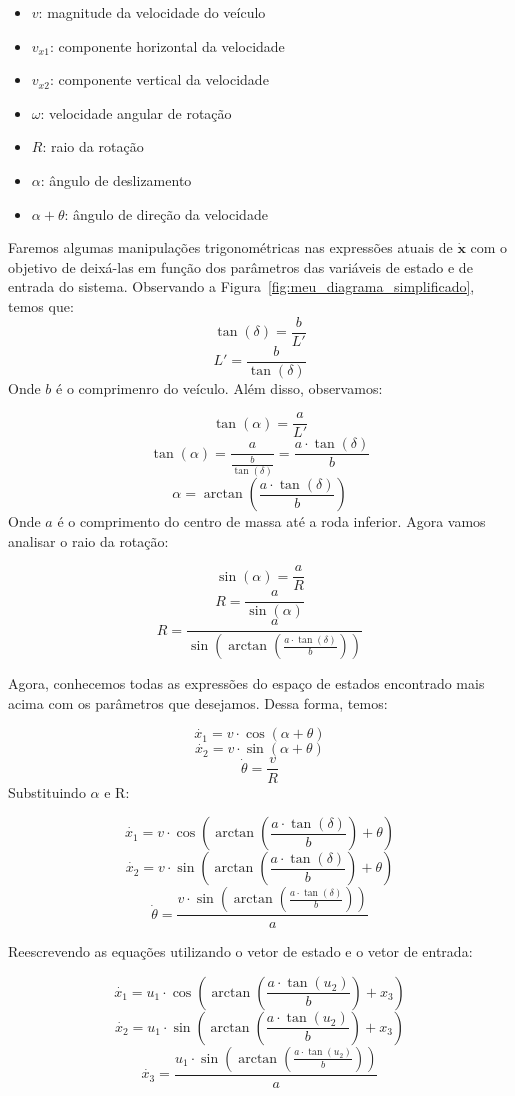 \documentclass[a4paper,11pt]{article}
\begin{document}
\begin{itemize}
    \item $v$: magnitude da velocidade do veículo 
    \item $v_{x1}$: componente horizontal da velocidade
    \item $v_{x2}$: componente vertical da velocidade
    \item $\omega$: velocidade angular de rotação
    \item $R$: raio da rotação
    \item $\alpha$: ângulo de deslizamento
    \item $\alpha + \theta$: ângulo de direção da velocidade 
\end{itemize}

Faremos algumas manipulações trigonométricas nas expressões atuais de $\dot{\textbf{x}}$ com o objetivo de deixá-las em função dos parâmetros das variáveis de estado e de entrada do sistema. Observando a Figura~\ref{fig:meu_diagrama_simplificado}, temos que:
\[
    \tan(\delta) = \frac{b}{L'}
\]
\[
    L' = \frac{b}{\tan(\delta)}
\]
Onde $b$ é o comprimenro do veículo. Além disso, observamos:

\[
    \tan(\alpha) = \frac{a}{L'}
\] 
\[
    \tan(\alpha) = \frac{a}{\frac{b}{\tan(\delta)}} =\frac{a \cdot \tan(\delta)}{b}
\]
\[
    \alpha = \arctan(\frac{a \cdot \tan(\delta)}{b})
\]
Onde $a$ é o comprimento do centro de massa até a roda inferior. Agora vamos analisar o raio da rotação:

\[
    \sin{(\alpha)} = \frac{a}{R}
\]
\[
    R = \frac{a}{\sin{(\alpha)}}
\]
\[
    R = \frac{a}{\sin{(\arctan(\frac{a \cdot \tan(\delta)}{b}))}}
\]

Agora, conhecemos todas as expressões do espaço de estados encontrado mais acima com os parâmetros que desejamos. Dessa forma, temos:

\[
    \dot{x_1} = v \cdot \cos{(\alpha + \theta)}
\]
\[
    \dot{x_2} = v \cdot \sin{(\alpha + \theta)}
\]
\[
    \dot{\theta} = \dfrac{v}{R}
\]
Substituindo $\alpha$ e R:

\[  
    \dot{x_1} = v \cdot \cos{(\arctan(\frac{a \cdot \tan(\delta)}{b}) + \theta)}
\]
\[
    \dot{x_2} = v \cdot \sin{(\arctan(\frac{a \cdot \tan(\delta)}{b}) + \theta)}
\]
\[
    \dot{\theta} = \frac{v \cdot \sin{(\arctan(\frac{a \cdot \tan(\delta)}{b}))}}{a}
\]

Reescrevendo as equações utilizando o vetor de estado e o vetor de entrada:

\[  
    \dot{x_1} = u_1 \cdot \cos{(\arctan(\frac{a \cdot \tan(u_2)}{b}) + x_3)}
\]
\[
    \dot{x_2} = u_1 \cdot \sin{(\arctan(\frac{a \cdot \tan(u_2)}{b}) + x_3)}
\]
\[
    \dot{x_3} = \frac{u_1 \cdot \sin{(\arctan(\frac{a \cdot \tan(u_2)}{b}))}}{a}
\]
\end{document}
